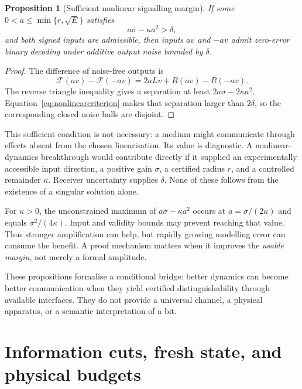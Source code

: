 \documentclass[11pt,a4paper]{article}
\newtheorem{proposition}[theorem]{Proposition}
\theoremstyle{definition}
\theoremstyle{remark}
\begin{document}
\begin{proposition}[Sufficient nonlinear signalling margin]\label{prop:nonlinearbit}
If some $0<a\leq\min\{r,\sqrt E\}$ satisfies
\begin{equation}\label{eq:nonlinearcriterion}
 a\sigma-\kappa a^2>\delta,
\end{equation}
and both signed inputs are admissible, then inputs $av$ and $-av$ admit zero-error binary decoding under additive output noise bounded by $\delta$.
\end{proposition}
\begin{proof}
The difference of noise-free outputs is
\[
 \mathcal F(av)-\mathcal F(-av)=2aLv+R(av)-R(-av).
\]
The reverse triangle inequality gives a separation at least $2a\sigma-2\kappa a^2$. Equation~\eqref{eq:nonlinearcriterion} makes that separation larger than $2\delta$, so the corresponding closed noise balls are disjoint.
\end{proof}
This sufficient condition is not necessary: a medium might communicate through effects absent from the chosen linearisation. Its value is diagnostic. A nonlinear-dynamics breakthrough would contribute directly if it supplied an experimentally accessible input direction, a positive gain $\sigma$, a certified radius $r$, and a controlled remainder $\kappa$. Receiver uncertainty supplies $\delta$. None of these follows from the existence of a singular solution alone.

For $\kappa>0$, the unconstrained maximum of $a\sigma-\kappa a^2$ occurs at $a=\sigma/(2\kappa)$ and equals $\sigma^2/(4\kappa)$. Input and validity bounds may prevent reaching that value. Thus stronger amplification can help, but rapidly growing modelling error can consume the benefit. A proof mechanism matters when it improves the \emph{usable margin}, not merely a formal amplitude.

These propositions formalise a conditional bridge: better dynamics can become better communication when they yield certified distinguishability through available interfaces. They do not provide a universal channel, a physical apparatus, or a semantic interpretation of a bit.










\section{Information cuts, fresh state, and physical budgets}\label{sec:cuts}
\end{document}
